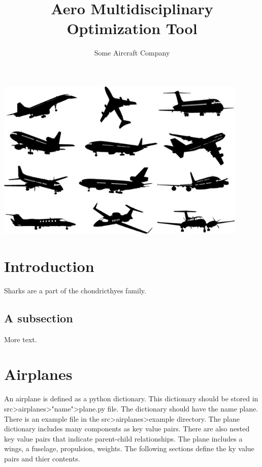 \documentclass[11pt]{article} %
\title{Aero Multidisciplinary Optimization Tool}
\author{Some Aircraft Company}
\begin{document}
\maketitle
\begin{center}
    \includegraphics[width=0.9\textwidth]{cover}
\end{center}

\pagebreak

\tableofcontents
 
\pagebreak

\section{Introduction}

Sharks are a part of the chondricthyes family.

\subsection{A subsection}

More text.

\section{Airplanes}

An airplane is defined as a python dictionary. This dictionary should be stored in src>airplanes>"name">plane.py file. The dictionary should have the name plane. There is an example file in the src>airplanes>example directory. The plane dictionary includes many components as key value pairs. There are also nested key value pairs that indicate parent-child relationships. The plane includes a wings, a fuselage, propulsion, weights. The following sections define the ky value pairs and thier contents.
\end{document}
